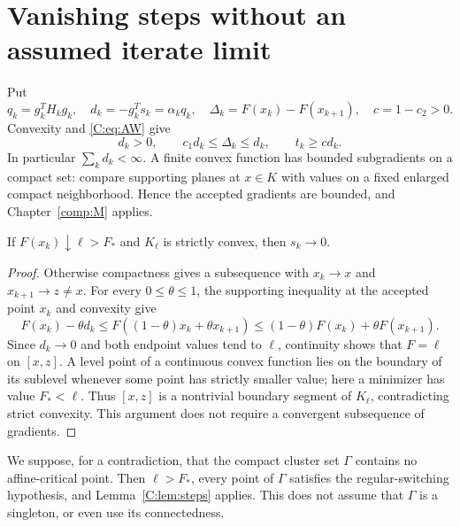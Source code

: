 \setcounter{section}{2}
\setcounter{theorem}{3}
\setcounter{equation}{4}


\section{Vanishing steps without an assumed iterate limit}
Put
\[
 q_k=g_k^TH_kg_k,\quad d_k=-g_k^Ts_k=\alpha_kq_k,\quad
 \Delta_k=F(x_k)-F(x_{k+1}),\quad c=1-c_2>0.
\]
Convexity and \eqref{C:eq:AW} give
\begin{equation}\label{C:eq:eligible}
 d_k>0,\qquad c_1d_k\le\Delta_k\le d_k,\qquad t_k\ge c d_k.
\end{equation}
In particular $\sum_k d_k<\infty$. A finite convex function has bounded subgradients on a compact set: compare supporting planes at $x\in K$ with values on a fixed enlarged compact neighborhood. Hence the accepted gradients are bounded, and Chapter~\ref{comp:M} applies.

\begin{lemma}\label{C:lem:steps}
If $F(x_k)\downarrow\ell>F_*$ and $K_\ell$ is strictly convex, then $s_k\to0$.
\end{lemma}
\begin{proof}
Otherwise compactness gives a subsequence with $x_k\to x$ and $x_{k+1}\to z\ne x$. For every $0\le\theta\le1$, the supporting inequality at the accepted point $x_k$ and convexity give
\[
 F(x_k)-\theta d_k
 \le F((1-\theta)x_k+\theta x_{k+1})
 \le(1-\theta)F(x_k)+\theta F(x_{k+1}).
\]
Since $d_k\to0$ and both endpoint values tend to $\ell$, continuity shows that $F=\ell$ on $[x,z]$. A level point of a continuous convex function lies on the boundary of its sublevel whenever some point has strictly smaller value; here a minimizer has value $F_*<\ell$. Thus $[x,z]$ is a nontrivial boundary segment of $K_\ell$, contradicting strict convexity. This argument does not require a convergent subsequence of gradients.
\end{proof}

We suppose, for a contradiction, that the compact cluster set $\Gamma$ contains no affine-critical point. Then $\ell>F_*$, every point of $\Gamma$ satisfies the regular-switching hypothesis, and Lemma~\ref{C:lem:steps} applies. This does not assume that $\Gamma$ is a singleton, or even use its connectedness.


\setcounter{section}{3}
\setcounter{theorem}{4}
\setcounter{equation}{5}


